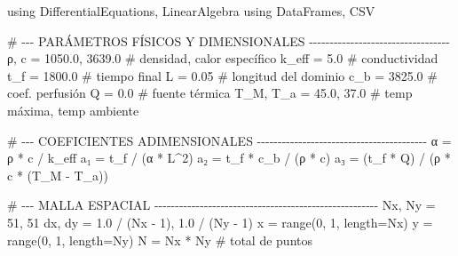 \documentclass[
  spanish,
  us-letterpaper,
  DIV=11,
  numbers=noendperiod]{scrreprt}
\newenvironment{Shaded}{\begin{snugshade}}{\end{snugshade}}
\newcommand{\BuiltInTok}[1]{\textcolor[rgb]{0.00,0.23,0.31}{#1}}
\newcommand{\CommentTok}[1]{\textcolor[rgb]{0.37,0.37,0.37}{#1}}
\newcommand{\FloatTok}[1]{\textcolor[rgb]{0.68,0.00,0.00}{#1}}
\newcommand{\FunctionTok}[1]{\textcolor[rgb]{0.28,0.35,0.67}{#1}}
\newcommand{\ImportTok}[1]{\textcolor[rgb]{0.00,0.46,0.62}{#1}}
\newcommand{\NormalTok}[1]{\textcolor[rgb]{0.00,0.23,0.31}{#1}}
\newcommand{\OperatorTok}[1]{\textcolor[rgb]{0.37,0.37,0.37}{#1}}
\theoremstyle{plain}
\theoremstyle{definition}
\theoremstyle{remark}
\begin{document}
\begin{Shaded}
\begin{Highlighting}[]
\ImportTok{using} \BuiltInTok{DifferentialEquations}\NormalTok{, }\BuiltInTok{LinearAlgebra}
\ImportTok{using} \BuiltInTok{DataFrames}\NormalTok{, }\BuiltInTok{CSV}

\CommentTok{\# {-}{-}{-} PARÁMETROS FÍSICOS Y DIMENSIONALES {-}{-}{-}{-}{-}{-}{-}{-}{-}{-}{-}{-}{-}{-}{-}{-}{-}{-}{-}{-}{-}{-}{-}{-}{-}{-}{-}{-}{-}{-}{-}{-}{-}{-}}
\NormalTok{ρ, c  }\OperatorTok{=} \FloatTok{1050.0}\NormalTok{, }\FloatTok{3639.0}                       \CommentTok{\# densidad, calor específico }
\NormalTok{k\_eff }\OperatorTok{=} \FloatTok{5.0}                                  \CommentTok{\# conductividad}
\NormalTok{t\_f   }\OperatorTok{=} \FloatTok{1800.0}                               \CommentTok{\# tiempo final }
\NormalTok{L     }\OperatorTok{=} \FloatTok{0.05}                                 \CommentTok{\# longitud del dominio}
\NormalTok{c\_b   }\OperatorTok{=} \FloatTok{3825.0}                               \CommentTok{\# coef. perfusión}
\NormalTok{Q     }\OperatorTok{=} \FloatTok{0.0}                                  \CommentTok{\# fuente térmica}
\NormalTok{T\_M, T\_a }\OperatorTok{=} \FloatTok{45.0}\NormalTok{, }\FloatTok{37.0}                        \CommentTok{\# temp máxima, temp ambiente}

\CommentTok{\# {-}{-}{-} COEFICIENTES ADIMENSIONALES {-}{-}{-}{-}{-}{-}{-}{-}{-}{-}{-}{-}{-}{-}{-}{-}{-}{-}{-}{-}{-}{-}{-}{-}{-}{-}{-}{-}{-}{-}{-}{-}{-}{-}{-}{-}{-}{-}{-}{-}{-}}
\NormalTok{α }\OperatorTok{=}\NormalTok{ ρ }\OperatorTok{*}\NormalTok{ c }\OperatorTok{/}\NormalTok{ k\_eff}
\NormalTok{a₁ }\OperatorTok{=}\NormalTok{ t\_f }\OperatorTok{/}\NormalTok{ (α }\OperatorTok{*}\NormalTok{ L}\OperatorTok{\^{}}\FloatTok{2}\NormalTok{)}
\NormalTok{a₂ }\OperatorTok{=}\NormalTok{ t\_f }\OperatorTok{*}\NormalTok{ c\_b }\OperatorTok{/}\NormalTok{ (ρ }\OperatorTok{*}\NormalTok{ c)}
\NormalTok{a₃ }\OperatorTok{=}\NormalTok{ (t\_f }\OperatorTok{*}\NormalTok{ Q) }\OperatorTok{/}\NormalTok{ (ρ }\OperatorTok{*}\NormalTok{ c }\OperatorTok{*}\NormalTok{ (T\_M }\OperatorTok{{-}}\NormalTok{ T\_a))}

\CommentTok{\# {-}{-}{-} MALLA ESPACIAL {-}{-}{-}{-}{-}{-}{-}{-}{-}{-}{-}{-}{-}{-}{-}{-}{-}{-}{-}{-}{-}{-}{-}{-}{-}{-}{-}{-}{-}{-}{-}{-}{-}{-}{-}{-}{-}{-}{-}{-}{-}{-}{-}{-}{-}{-}{-}{-}{-}{-}{-}{-}{-}{-}}
\NormalTok{Nx, Ny }\OperatorTok{=} \FloatTok{51}\NormalTok{, }\FloatTok{51}
\NormalTok{dx, dy }\OperatorTok{=} \FloatTok{1.0} \OperatorTok{/}\NormalTok{ (Nx }\OperatorTok{{-}} \FloatTok{1}\NormalTok{), }\FloatTok{1.0} \OperatorTok{/}\NormalTok{ (Ny }\OperatorTok{{-}} \FloatTok{1}\NormalTok{)}
\NormalTok{x }\OperatorTok{=} \FunctionTok{range}\NormalTok{(}\FloatTok{0}\NormalTok{, }\FloatTok{1}\NormalTok{, length}\OperatorTok{=}\NormalTok{Nx)}
\NormalTok{y }\OperatorTok{=} \FunctionTok{range}\NormalTok{(}\FloatTok{0}\NormalTok{, }\FloatTok{1}\NormalTok{, length}\OperatorTok{=}\NormalTok{Ny)}
\NormalTok{N }\OperatorTok{=}\NormalTok{ Nx }\OperatorTok{*}\NormalTok{ Ny  }\CommentTok{\# total de puntos}


\end{Highlighting}
\end{Shaded}
\end{document}
